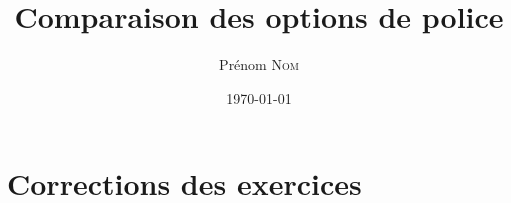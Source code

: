\documentclass[11pt]{ocots-book}
\title{Comparaison des options de police}
\author{Prénom \textsc{Nom}}
\date{\today}
\begin{document}
\maketitle
\ocotscollectsolutions%

\chapter{Corrections des exercices}
\ocotsprintsolutions%
\end{document}
